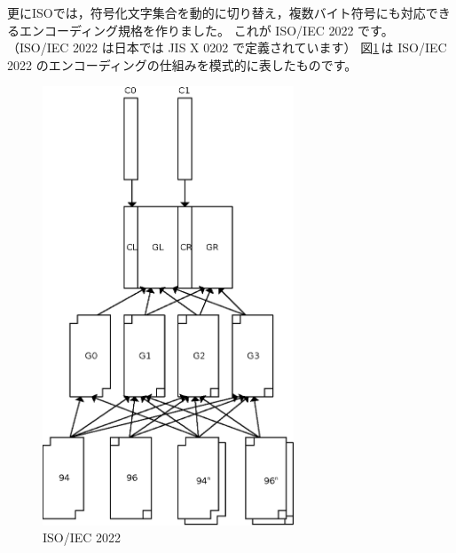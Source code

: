 \documentclass[a4j,10pt,fleqn]{jsarticle}
\begin{document}
更にISOでは，符号化文字集合を動的に切り替え，複数バイト符号にも対応できるエンコーディング規格を作りました。
これが ISO/IEC 2022 です。
（ISO/IEC 2022 は日本では JIS X 0202 で定義されています）
図\ref{fig:ISO2022-8}\,は ISO/IEC 2022 のエンコーディングの仕組みを模式的に表したものです。

\begin{figure}[htp]
\begin{center}
\includegraphics[width=7.5cm,clip]{iso2022-8.eps}
\end{center}
\caption{ISO/IEC 2022} \label{fig:ISO2022-8}
\end{figure}
\end{document}
